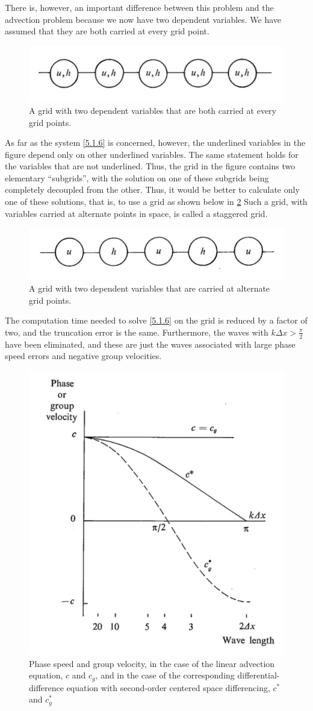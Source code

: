 There is, however, an important difference between this problem and the advection problem because we now have two dependent variables. We have assumed that they are both carried at every grid point.\begin{figure}[h]
	\centering
	\includegraphics[width=0.5\linewidth]{uploads/Screenshot 2024-11-13 180623.png}
	\caption{A grid with two dependent variables that are both carried at every grid points.}
	\label{fig:5.1.3}
\end{figure}
As far as the system \ref{5.1.6} is concerned, however, the underlined variables in the figure depend only on other underlined variables. The same statement holds for the variables that are not underlined. Thus, the grid in the figure contains two elementary “subgrids”, with the solution on one of these subgrids being completely decoupled from the other. Thus, it would be better to calculate only one of these solutions, that is, to use a grid as shown below in \ref{fig:5.1.4} Such a grid, with variables carried at alternate points in space, is called a staggered grid.
\begin{figure}[h]
	\centering
	\includegraphics[width=0.5\linewidth]{uploads/Screenshot 2024-11-13 180824.png}
	\caption{A grid with two dependent variables that are carried at alternate grid points.}
	\label{fig:5.1.4}
\end{figure}
The computation time needed to solve \ref{5.1.6} on the grid is reduced by a factor of two, and the truncation error is the same. Furthermore, the waves with $k\Delta x>\frac{\pi}{2}$ have been eliminated, and these are just the waves associated with large phase speed errors and negative group velocities.
\begin{figure}[h!]
	\centering
	\includegraphics[width=0.45\linewidth]{uploads/Screenshot 2024-11-14 112837.png}
	\caption{Phase speed and group velocity, in the case of the linear advection equation, $c$ and $c_g$, and in the case of the corresponding differential-difference equation with second-order centered space differencing, $c^*$ and $c^*_g$}
	\label{fig:4.2.2}
\end{figure}


